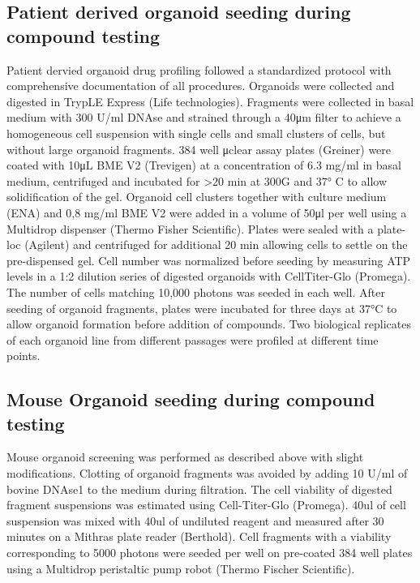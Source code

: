 \begin{flushleft}
\subsection{Patient derived organoid seeding during compound testing}
Patient dervied organoid drug profiling followed a standardized protocol with comprehensive documentation of all procedures. Organoids were collected and digested in TrypLE Express (Life technologies). Fragments were collected in basal medium with 300 U/ml DNAse and strained through a 40μm filter to achieve a homogeneous cell suspension with single cells and small clusters of cells, but without large organoid fragments. 384 well μclear assay plates (Greiner) were coated with 10μL BME V2 (Trevigen) at a concentration of 6.3 mg/ml in basal medium, centrifuged and incubated for >20 min at 300G and 37° C to allow solidification of the gel. Organoid cell clusters together with culture medium (ENA) and 0,8 mg/ml BME V2 were added in a volume of 50μl per well using a Multidrop dispenser (Thermo Fisher Scientific). Plates were sealed with a plate-loc (Agilent) and centrifuged for additional 20 min allowing cells to settle on the pre-dispensed gel. Cell number was normalized before seeding by measuring ATP levels in a 1:2 dilution series of digested organoids with CellTiter-Glo (Promega). The number of cells matching 10,000 photons was seeded in each well. After seeding of organoid fragments, plates were incubated for three days at 37°C to allow organoid formation before addition of compounds. Two biological replicates of each organoid line from different passages were profiled at different time points.

\subsection{Mouse Organoid seeding during compound testing}
Mouse organoid screening was performed as described above with slight modifications. Clotting of organoid fragments was avoided by adding 10 U/ml of bovine DNAse1 to the medium during filtration. The cell viability of digested fragment suspensions was estimated using Cell-Titer-Glo (Promega). 40ul of cell suspension was mixed with 40ul of undiluted reagent and measured after 30 minutes on a Mithras plate reader (Berthold). Cell fragments with a viability corresponding to 5000 photons were seeded per well on pre-coated 384 well plates using a Multidrop peristaltic pump robot (Thermo Fischer Scientific). 


\end{flushleft}
